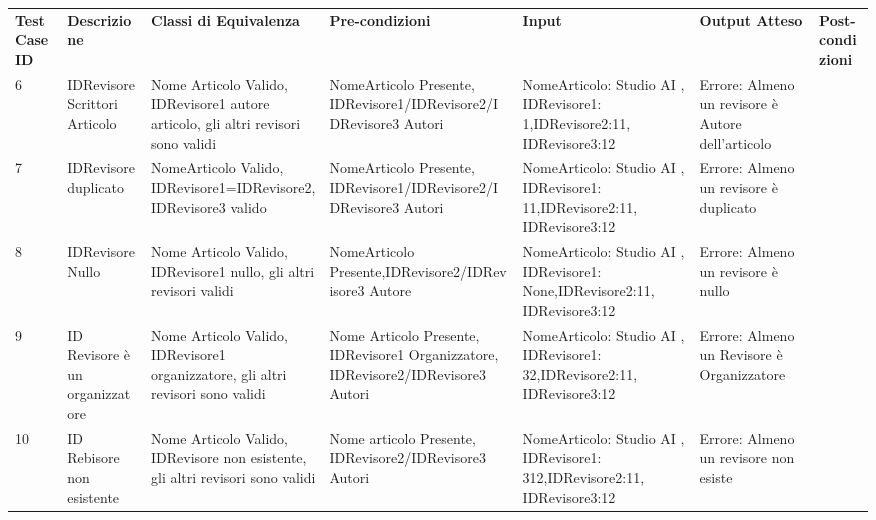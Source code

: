 \begin{sidewaystable}
\begin{tabular}{|p{3cm}|p{2cm}|p{2cm}|p{2cm}|p{4cm}|p{2cm}|p{2cm}|}
\hline
\rowcolor{SkyBlue}
\multicolumn{7}{l}{\textbf{Test Suite: Assegna Revisore 1}}\\
\hline
\rowcolor{Red}
\textbf{Test Case ID} & \textbf{Descrizione} & \textbf{Classi di Equivalenza} & \textbf{Pre-condizioni} & \textbf{Input} & \textbf{Output Atteso} & \textbf{Post-condizioni} \\
\hline
6&IDRevisore Scrittori Articolo& Nome Articolo Valido, IDRevisore1 autore articolo, gli altri revisori sono validi&NomeArticolo Presente, IDRevisore1/IDRevisore2/IDRevisore3 Autori&NomeArticolo: Studio AI , IDRevisore1: 1,IDRevisore2:11, IDRevisore3:12&Errore: Almeno un revisore è Autore dell'articolo &\\
\hline
7&IDRevisore duplicato& NomeArticolo Valido, IDRevisore1=IDRevisore2,IDRevisore3 valido &NomeArticolo Presente, IDRevisore1/IDRevisore2/IDRevisore3 Autori&NomeArticolo: Studio AI , IDRevisore1: 11,IDRevisore2:11, IDRevisore3:12&Errore: Almeno un revisore è duplicato &\\
\hline
8&IDRevisore Nullo& Nome Articolo Valido, IDRevisore1 nullo, gli altri revisori validi&NomeArticolo Presente,IDRevisore2/IDRevisore3 Autore& NomeArticolo: Studio AI , IDRevisore1: None,IDRevisore2:11, IDRevisore3:12& Errore: Almeno un revisore è nullo&\\
\hline
9&ID Revisore è un organizzatore&Nome Articolo Valido, IDRevisore1 organizzatore, gli altri revisori sono validi & Nome Articolo Presente, IDRevisore1 Organizzatore, IDRevisore2/IDRevisore3 Autori& NomeArticolo: Studio AI , IDRevisore1: 32,IDRevisore2:11, IDRevisore3:12&Errore: Almeno un Revisore è Organizzatore&\\
\hline
10&ID Rebisore non esistente&Nome Articolo Valido, IDRevisore non esistente, gli altri revisori sono validi & Nome articolo Presente, IDRevisore2/IDRevisore3 Autori&NomeArticolo: Studio AI , IDRevisore1: 312,IDRevisore2:11, IDRevisore3:12&Errore: Almeno un revisore non esiste&\\
\hline 
\end{tabular}
\end{sidewaystable}


